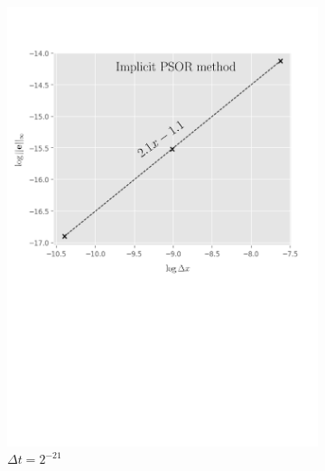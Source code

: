\begin{figure}[H]
  \centering
  \begin{subfigure}{0.4\textwidth}
    \centering
    \includegraphics[width=\textwidth]{chapters/chapter5/ConvergenceSpaceImplicitLCP.pdf}
    \caption{$\Delta{x}=2^{-7},\dots,2^{-10}$}
    \caption*{$\Delta{t}=2^{-21}$}
    \label{fig:lcp:numericalresults:convergence_space_implicit}
  \end{subfigure}
  \hspace{0.5cm}
  \begin{subfigure}{0.4\textwidth}
    \centering

\end{subfigure}
\end{figure}
